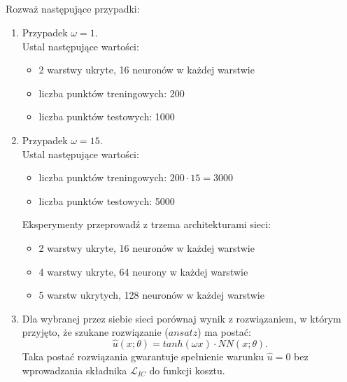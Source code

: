 \documentclass[11pt, leqno]{scrartcl}
\begin{document}
    \subsection*{}
    Rozważ następujące przypadki:
    \begin{enumerate}
        \item Przypadek $\omega=1$. \\
            Ustal następujące wartości:
            \begin{itemize}[label=--]
                \item 2 warstwy ukryte, 16 neuronów w każdej
                    warstwie
                \item liczba punktów treningowych: 200
                \item liczba punktów testowych: 1000
            \end{itemize}
        \item Przypadek $\omega=15$. \\
            Ustal następujące wartości:
            \begin{itemize}[label=--]
                \item liczba punktów treningowych:
                    $200 \cdot 15=3000$
                \item liczba punktów testowych: 5000
            \end{itemize}
            Eksperymenty przeprowadź z trzema architekturami
            sieci:
            \begin{itemize}[label=--]
                \item 2 warstwy ukryte, 16 neuronów w każdej
                    warstwie
                \item 4 warstwy ukryte, 64 neurony w każdej
                    warstwie
                \item 5 warstw ukrytych, 128 neuronów w każdej
                    warstwie
            \end{itemize}
        \item Dla wybranej przez siebie sieci porównaj wynik
            z rozwiązaniem, w którym przyjęto, że szukane
            rozwiązanie ($ansatz$) ma postać:
            \[
                \hat{u}(x;\theta)=tanh(\omega x) \cdot
                    NN(x;\theta).
            \]
            Taka postać rozwiązania gwarantuje spełnienie warunku
            $\hat{u}=0$ bez wprowadzania składnika
            $\mathcal{L}_{IC}$ do funkcji kosztu.
    \end{enumerate}
\end{document}
